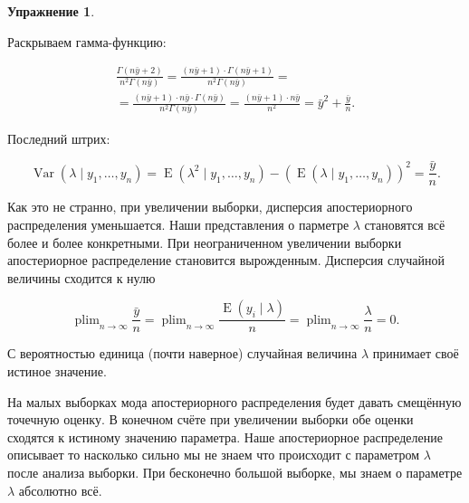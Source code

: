 \documentclass[12pt, a4paper, oneside]{extreport}
\DeclareMathOperator{\Var}{Var}
\DeclareMathOperator{\E}{\mathop{E}}
\DeclareMathOperator*{\plim}{plim}
\theoremstyle{plain}              %
\theoremstyle{definition}         %
\newtheorem{problem}{\color{myblue} Упражнение}
\begin{document}
\begin{problem}
\begin{sol}
Раскрываем гамма-функцию:

\begin{multline*}
 \frac{\Gamma(n \bar{y} + 2)}{n^2 \Gamma(n\bar y)} = \frac{(n \bar y + 1) \cdot \Gamma(n \bar y + 1)}{n^2 \Gamma(n \bar y)} = \\ =   \frac{(n \bar y + 1) \cdot n \bar y \cdot \Gamma(n \bar y)}{n^2 \Gamma(n \bar y)} = \frac{(n \bar y + 1) \cdot n \bar y}{n^2} = \bar{y}^2 + \frac{\bar y}{n}. 
\end{multline*}

Последний штрих:

\[ \Var(\lambda \mid y_1, \ldots, y_n) = \E(\lambda^2 \mid y_1, \ldots, y_n) - (\E(\lambda \mid y_1, \ldots, y_n))^2 = \frac{\bar y}{n}.\]

Как это не странно, при увеличении выборки, дисперсия апостериорного распределения уменьшается. Наши представления о парметре $\lambda$ становятся всё более и более конкретными. При неограниченном увеличении выборки апостериорное распределение становится вырожденным. Дисперсия случайной величины сходится к нулю

\[\plim_{n \to \infty} \frac{\bar y}{n} =  \plim_{n \to \infty} \frac{\E(y_i \mid \lambda)}{n} = \plim_{n \to \infty} \frac{\lambda}{n} = 0.\]

С вероятностью единица (почти наверное) случайная величина $\lambda$ принимает своё истиное значение.

 На малых выборках мода апостериорного распределения будет давать смещённую точечную оценку.  В конечном счёте при увеличении выборки обе оценки сходятся к истиному значению параметра. Наше апостериорное распределение описывает то насколько сильно мы не знаем что происходит с параметром $\lambda$ после анализа выборки. При бесконечно большой выборке, мы знаем о параметре $\lambda$ абсолютно всё.  
\end{sol}
\end{problem}
\end{document}
